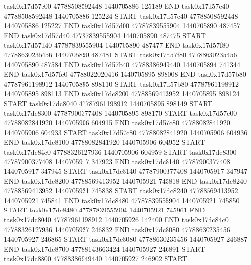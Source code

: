 task0x17d57e00 47788508592448          1440705886               125189  END
task0x17d57c40 47788508592448          1440705886               125224  START
task0x17d57c40 47788508592448          1440705886               125227  END
task0x17d57d00 47787839555904          1440705890               487457  END
task0x17d57d40 47787839555904          1440705890               487475  START
task0x17d57d40 47787839555904          1440705890               487477  END
task0x17d57f80 47788630235456          1440705890               487481  START
task0x17d57f80 47788630235456          1440705890               487584  END
task0x17d57b40 47788386949440          1440705894               741344  END
task0x17d57fc0 47788022020416          1440705895               898008  END
task0x17d57b80 47787961198912          1440705895               898110  START
task0x17d57b80 47787961198912          1440705895               898113  END
task0x17dc8200 47788569413952          1440705895               898124  START
task0x17dc8040 47787961198912          1440705895               898149  START
task0x17dc8300 47787900377408          1440705895               898170  START
task0x17d57c00 47788082841920          1440705906               604915  END
task0x17d57c80 47788082841920          1440705906               604933  START
task0x17d57c80 47788082841920          1440705906               604936  END
task0x17dc8100 47788082841920          1440705906               604952  START
task0x17dc84c0 47788326127936          1440705906               604959  START
task0x17dc8300 47787900377408          1440705917               347923  END
task0x17dc8140 47787900377408          1440705917               347945  START
task0x17dc8140 47787900377408          1440705917               347947  END
task0x17dc8200 47788569413952          1440705921               745818  END
task0x17dc8240 47788569413952          1440705921               745838  START
task0x17dc8240 47788569413952          1440705921               745841  END
task0x17dc8480 47787839555904          1440705921               745850  START
task0x17dc8480 47787839555904          1440705921               745961  END
task0x17dc8040 47787961198912          1440705926               142400  END
task0x17dc84c0 47788326127936          1440705927               246832  END
task0x17dc8080 47788630235456          1440705927               246865  START
task0x17dc8080 47788630235456          1440705927               246887  END
task0x17dc8700 47788143663424          1440705927               246891  START
task0x17dc8800 47788386949440          1440705927               246902  START
